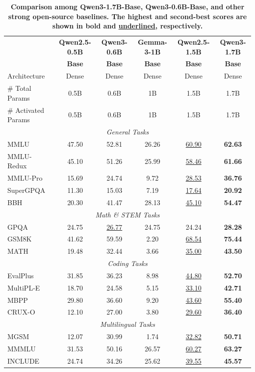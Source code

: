 \begin{table}[tbp]
\centering
\caption{\textbf{Comparison among Qwen3-1.7B-Base, Qwen3-0.6B-Base, and other strong open-source baselines. The highest and second-best scores are shown in \textbf{bold} and \underline{underlined}, respectively.}}
\label{tab:base-1B}
\small %
\begin{tabular}{@{}lccccc@{}}
\toprule
 & \textbf{Qwen2.5-0.5B} & \textbf{Qwen3-0.6B} & \textbf{Gemma-3-1B} & \textbf{Qwen2.5-1.5B} & \textbf{Qwen3-1.7B} \\
 & \textbf{Base} & \textbf{Base} & \textbf{Base} & \textbf{Base} & \textbf{Base} \\
\midrule
Architecture & Dense & Dense & Dense & Dense & Dense\\
\# Total Params & 0.5B & 0.6B & 1B & 1.5B & 1.7B \\
\# Activated Params & 0.5B & 0.6B & 1B & 1.5B & 1.7B \\
\midrule
\multicolumn{6}{c}{\textit{General Tasks}} \\
\midrule
MMLU & 47.50 & 52.81 & 26.26 & \underline{60.90} & \textbf{62.63} \\
MMLU-Redux & 45.10 & 51.26 & 25.99 & \underline{58.46} & \textbf{61.66} \\
MMLU-Pro & 15.69 & 24.74 & 9.72 & \underline{28.53} & \textbf{36.76} \\
SuperGPQA & 11.30 & 15.03 & 7.19 & \underline{17.64} & \textbf{20.92} \\
BBH & 20.30 & 41.47 & 28.13 & \underline{45.10} & \textbf{54.47} \\
\midrule
\multicolumn{6}{c}{\textit{Math \& STEM Tasks}} \\
\midrule
GPQA & 24.75 & \underline{26.77} & 24.75 & 24.24 & \textbf{28.28} \\
GSM8K & 41.62 & 59.59 & 2.20 & \underline{68.54} & \textbf{75.44} \\
MATH & 19.48 & 32.44 & 3.66 & \underline{35.00} & \textbf{43.50} \\
\midrule
\multicolumn{6}{c}{\textit{Coding Tasks}} \\
\midrule
EvalPlus & 31.85 & 36.23 & 8.98 & \underline{44.80} & \textbf{52.70} \\
MultiPL-E & 18.70 & 24.58 & 5.15 & \underline{33.10} & \textbf{42.71} \\
MBPP & 29.80 & 36.60 & 9.20 & \underline{43.60} & \textbf{55.40} \\
CRUX-O & 12.10 & 27.00 & 3.80 & \underline{29.60} & \textbf{36.40} \\
\midrule
\multicolumn{6}{c}{\textit{Multilingual Tasks}} \\
\midrule
MGSM & 12.07 & 30.99 & 1.74 & \underline{32.82} & \textbf{50.71} \\
MMMLU & 31.53 & 50.16 & 26.57 & \underline{60.27} & \textbf{63.27} \\
INCLUDE & 24.74 & 34.26 & 25.62 & \underline{39.55} & \textbf{45.57} \\
\bottomrule
\end{tabular}
\end{table}



